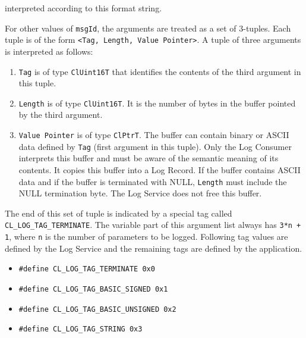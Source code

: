 \begin{flushleft}
\begin{Desc}
\begin{description}
interpreted according to this format string.
\par
For other values of {\tt{msgId}}, the arguments are treated as a set of 3-tuples. Each tuple is of the form {\tt{<Tag, Length, Value Pointer>}}. A tuple
of three arguments is interpreted as follows:
\begin{enumerate}
\item
{\tt{Tag}} is of type {\tt{ClUint16T}} that identifies the contents of the third argument in this tuple.
\item
{\tt{Length}} is of type {\tt{ClUint16T}}. It is the number of bytes in the buffer pointed by the third argument.
\item
{\tt{Value Pointer}} is of type {\tt{ClPtrT}}. The buffer can contain binary or ASCII data defined by {\tt{Tag}} (first argument in this tuple). Only 
the Log Consumer interprets this buffer and must be aware of the semantic meaning of its contents. It copies this buffer into a Log Record. If the buffer 
contains ASCII data and if the buffer is terminated with NULL, {\tt{Length}} must include the NULL termination byte. The Log Service does not free this
buffer.
\end{enumerate}
The end of this set of tuple is indicated by a special tag called {\tt{CL\_\-LOG\_\-TAG\_\-TERMINATE}}. The variable part of this argument list 
always has {\tt{3*n + 1}}, where {\tt{n}} is the number of parameters to be logged. Following tag values are defined by the Log Service and the 
remaining tags are defined by the application.
\begin{itemize}
\item
{\tt{\#define CL\_\-LOG\_\-TAG\_\-TERMINATE		0x0}}
\item
{\tt{\#define CL\_\-LOG\_\-TAG\_\-BASIC\_\-SIGNED		0x1}}
\item
{\tt{\#define CL\_\-LOG\_\-TAG\_\-BASIC\_\-UNSIGNED	0x2}}
\item
{\tt{\#define CL\_\-LOG\_\-TAG\_\-STRING		0x3}}
\end{itemize}


\end{description}
\end{Desc}
\end{flushleft}
